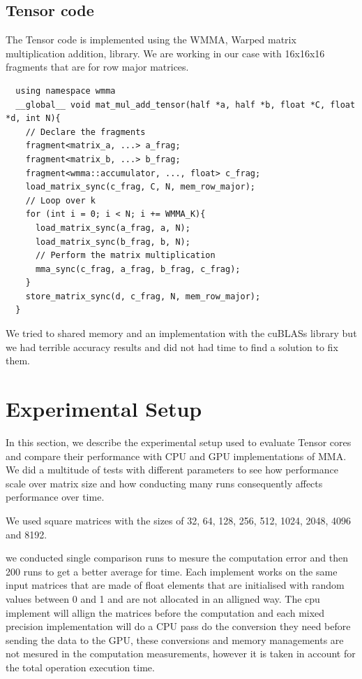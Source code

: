 \documentclass[conference]{IEEEtran}
\begin{document}
  
  \subsection{Tensor code}\label{sec:TensorCode}
  The Tensor code is implemented using the WMMA,  Warped matrix multiplication addition,
  library. We are working in our case with 16x16x16 fragments that are for row major matrices.
  \begin{lstlisting}
  using namespace wmma
  __global__ void mat_mul_add_tensor(half *a, half *b, float *C, float *d, int N){
    // Declare the fragments
    fragment<matrix_a, ...> a_frag;
    fragment<matrix_b, ...> b_frag;
    fragment<wmma::accumulator, ..., float> c_frag;
    load_matrix_sync(c_frag, C, N, mem_row_major);
    // Loop over k
    for (int i = 0; i < N; i += WMMA_K){
      load_matrix_sync(a_frag, a, N);
      load_matrix_sync(b_frag, b, N);
      // Perform the matrix multiplication
      mma_sync(c_frag, a_frag, b_frag, c_frag);
    }
    store_matrix_sync(d, c_frag, N, mem_row_major);
  }
  \end{lstlisting}

  We tried to shared memory and an implementation with the cuBLASs library but we had terrible 
  accuracy results and did not had time to find a solution to fix them. 

  \section{Experimental Setup}\label{sec:experimental-setup}
  
  In this section, we describe the experimental setup used to evaluate 
  Tensor cores and compare their performance with CPU and GPU implementations of MMA.
  We did a multitude of tests with different parameters to see how performance scale over matrix size
  and how conducting many runs consequently affects performance over time.

  We used square matrices with the sizes of 32, 64, 128, 256, 512, 1024, 2048, 4096 and 8192.

  we conducted single comparison runs to mesure the computation error and then 200 runs to get a better average for time.
  Each implement works on the same input matrices that are made of float elements that are initialised with random values between 0 and 1
  and are not allocated in an alligned way. The cpu implement will allign the matrices before the computation and each mixed precision implementation will do a CPU pass do the conversion they need
  before sending the data to the GPU, these conversions and memory managements are not mesured in the computation 
  measurements, however it is taken in account for the total operation execution time.
\end{document}
